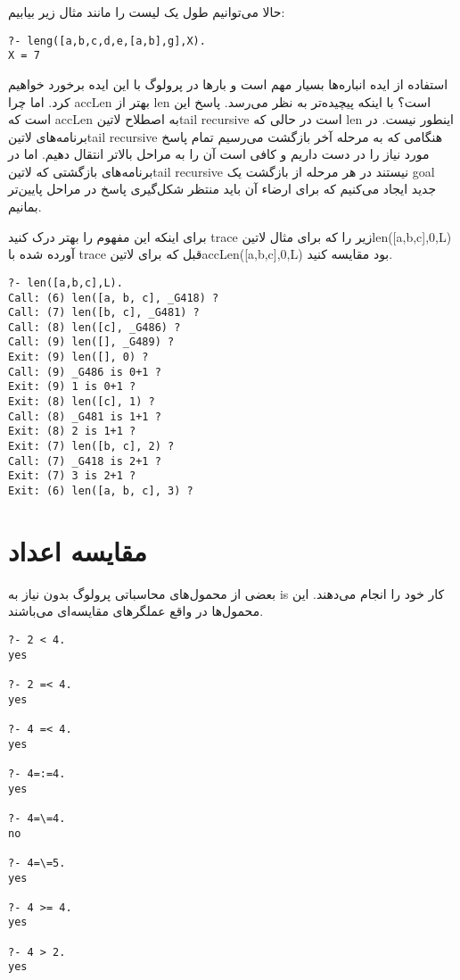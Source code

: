 حالا می‌توانیم طول یک لیست را مانند مثال زیر بیابیم:

\begin{latin}
\begin{lstlisting}
?- leng([a,b,c,d,e,[a,b],g],X).
X = 7
\end{lstlisting}
\end{latin}

استفاده از ایده انباره‌ها بسیار مهم است و بارها در پرولوگ با این ایده برخورد خواهیم کرد. اما چرا accLen بهتر از len است؟ با اینکه پیچیده‌تر به نظر می‌رسد. پاسخ این است که accLen به اصطلاح ‌لاتین{tail recursive} است در حالی که len اینطور نیست. در برنامه‌های ‌لاتین{tail recursive} هنگامی که به مرحله آخر بازگشت می‌رسیم تمام پاسخ مورد نیاز را در دست داریم و کافی است آن را به مراحل بالاتر انتقال دهیم. اما در برنامه‌های بازگشتی که ‌لاتین{tail recursive} نیستند در هر مرحله از بازگشت یک goal جدید ایجاد می‌کنیم که برای ارضاء آن باید منتظر شکل‌گیری پاسخ در مراحل پایین‌تر بمانیم.

برای اینکه این مفهوم را بهتر درک کنید trace زیر را که برای مثال ‌لاتین{len([a,b,c],0,L)} آورده شده با trace قبل که برای ‌لاتین{accLen([a,b,c],0,L)} بود مقایسه کنید.

\begin{latin}
\begin{lstlisting}
?- len([a,b,c],L).
Call: (6) len([a, b, c], _G418) ?
Call: (7) len([b, c], _G481) ?
Call: (8) len([c], _G486) ?
Call: (9) len([], _G489) ?
Exit: (9) len([], 0) ?
Call: (9) _G486 is 0+1 ?
Exit: (9) 1 is 0+1 ?
Exit: (8) len([c], 1) ?
Call: (8) _G481 is 1+1 ?
Exit: (8) 2 is 1+1 ?
Exit: (7) len([b, c], 2) ?
Call: (7) _G418 is 2+1 ?
Exit: (7) 3 is 2+1 ?
Exit: (6) len([a, b, c], 3) ?
\end{lstlisting}
\end{latin}

\section{مقایسه اعداد}
بعضی از محمول‌های محاسباتی پرولوگ بدون نیاز به is کار خود را انجام می‌دهند. این محمول‌ها در واقع عملگرهای مقایسه‌ای می‌باشند.

\begin{latin}
\begin{lstlisting}
?- 2 < 4.
yes

?- 2 =< 4.
yes

?- 4 =< 4.
yes

?- 4=:=4.
yes

?- 4=\=4.
no

?- 4=\=5.
yes

?- 4 >= 4.
yes

?- 4 > 2.
yes
\end{lstlisting}
\end{latin}

